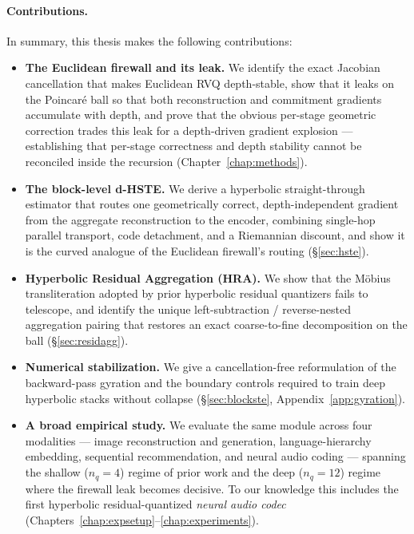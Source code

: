 \documentclass[12pt]{report}
\begin{document}
\paragraph{Contributions.} In summary, this thesis makes the following contributions:
\begin{itemize}
    \item \textbf{The Euclidean firewall and its leak.} We identify the exact Jacobian cancellation that makes Euclidean RVQ depth-stable, show that it leaks on the Poincar\'e ball so that both reconstruction and commitment gradients accumulate with depth, and prove that the obvious per-stage geometric correction trades this leak for a depth-driven gradient explosion --- establishing that per-stage correctness and depth stability cannot be reconciled inside the recursion (Chapter~\ref{chap:methods}).
    \item \textbf{The block-level d-HSTE.} We derive a hyperbolic straight-through estimator that routes one geometrically correct, depth-independent gradient from the aggregate reconstruction to the encoder, combining single-hop parallel transport, code detachment, and a Riemannian discount, and show it is the curved analogue of the Euclidean firewall's routing (\S\ref{sec:hste}).
    \item \textbf{Hyperbolic Residual Aggregation (HRA).} We show that the M\"obius transliteration adopted by prior hyperbolic residual quantizers fails to telescope, and identify the unique left-subtraction / reverse-nested aggregation pairing that restores an exact coarse-to-fine decomposition on the ball (\S\ref{sec:residagg}).
    \item \textbf{Numerical stabilization.} We give a cancellation-free reformulation of the backward-pass gyration and the boundary controls required to train deep hyperbolic stacks without collapse (\S\ref{sec:blockste}, Appendix~\ref{app:gyration}).
    \item \textbf{A broad empirical study.} We evaluate the same module across four modalities --- image reconstruction and generation, language-hierarchy embedding, sequential recommendation, and neural audio coding --- spanning the shallow ($n_q\!=\!4$) regime of prior work and the deep ($n_q\!=\!12$) regime where the firewall leak becomes decisive. To our knowledge this includes the first hyperbolic residual-quantized \emph{neural audio codec} (Chapters~\ref{chap:expsetup}--\ref{chap:experiments}).
\end{itemize}
\end{document}
